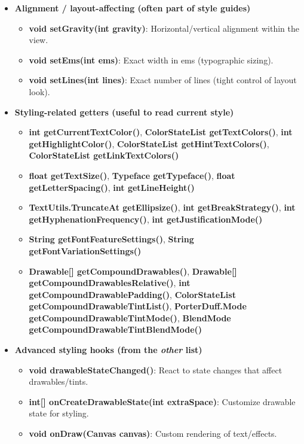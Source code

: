 \documentclass{report}
\begin{document}
\begin{itemize}
\begin{itemize}
        \item \textbf{Alignment / layout-affecting (often part of style guides)}
            \begin{itemize}
                \item \textbf{void setGravity(int gravity)}: Horizontal/vertical alignment within the view.
                \item \textbf{void setEms(int ems)}: Exact width in ems (typographic sizing).
                \item \textbf{void setLines(int lines)}: Exact number of lines (tight control of layout look).
            \end{itemize}

        \item \textbf{Styling-related getters (useful to read current style)}
            \begin{itemize}
                \item \textbf{int getCurrentTextColor()}, \textbf{ColorStateList getTextColors()}, \textbf{int getHighlightColor()}, \textbf{ColorStateList getHintTextColors()}, \textbf{ColorStateList getLinkTextColors()}
                \item \textbf{float getTextSize()}, \textbf{Typeface getTypeface()}, \textbf{float getLetterSpacing()}, \textbf{int getLineHeight()}
                \item \textbf{TextUtils.TruncateAt getEllipsize()}, \textbf{int getBreakStrategy()}, \textbf{int getHyphenationFrequency()}, \textbf{int getJustificationMode()}
                \item \textbf{String getFontFeatureSettings()}, \textbf{String getFontVariationSettings()}
                \item \textbf{Drawable[] getCompoundDrawables()}, \textbf{Drawable[] getCompoundDrawablesRelative()}, \textbf{int getCompoundDrawablePadding()}, \textbf{ColorStateList getCompoundDrawableTintList()}, \textbf{PorterDuff.Mode getCompoundDrawableTintMode()}, \textbf{BlendMode getCompoundDrawableTintBlendMode()}
            \end{itemize}

        \item \textbf{Advanced styling hooks (from the \emph{other} list)}
            \begin{itemize}
                \item \textbf{void drawableStateChanged()}: React to state changes that affect drawables/tints.
                \item \textbf{int[] onCreateDrawableState(int extraSpace)}: Customize drawable state for styling.
                \item \textbf{void onDraw(Canvas canvas)}: Custom rendering of text/effects.
            \end{itemize}
    \end{itemize}


\end{itemize}
\end{document}
